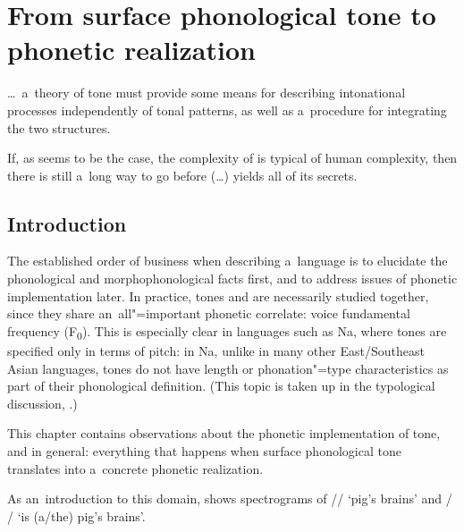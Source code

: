 \chapter{From surface phonological tone to phonetic realization}
\label{chap:fromsurfacephonologicalformstophoneticrealizationintonationandtonalimplementation}

\epigraph{{\dots}~a~theory of tone must provide some means for describing intonational processes independently of tonal patterns, as well as a~procedure for integrating the two structures.}{\citep[547]{clements1979}}

\epigraph{If, as seems to be the case, the complexity of  is typical of human complexity, then there is still a~long way to go before ({\dots})  yields all of its secrets.}{\citep[256]{vaissiere2004}}


\section{Introduction}
\label{sec:introductionsurfacetoreal}

The established order of business when describing a~language is to elucidate the phonological and morphophonological facts first, and to address issues of phonetic implementation later. In practice, tones and  are necessarily studied together, since they share an~all"=important phonetic
correlate: voice fundamental frequency (F\textsubscript{0}). This is especially clear in
languages such as Na, where tones are specified only in terms of pitch: in Na, unlike in
many other East/Southeast Asian languages, tones do not
have length or phonation"=type characteristics as part of their phonological definition. (This topic is taken up in the typological discussion, .)

This chapter contains observations about the phonetic implementation of tone, and  in general: everything that happens when surface phonological tone translates into a~concrete phonetic realization. 

As an~introduction to this domain,  shows spectrograms of // ‘pig’s brains’ and / /
‘is \mbox{(a/the)} pig’s brains’. 

